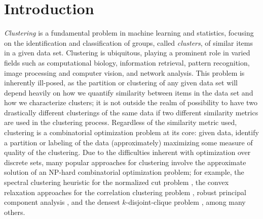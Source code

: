 \documentclass[twoside,11pt]{article}
\newcommand{\0}{\bs{0}}
\begin{document}
\allowdisplaybreaks

\section{Introduction} \label{intro}
\emph{Clustering} is a fundamental problem in machine learning and statistics, focusing on the identification and classification
of groups, called \emph{clusters}, of similar items in a given data set. Clustering is ubiquitous, playing a prominent role
in varied fields such as computational biology, information retrieval, pattern recognition, image processing and computer vision,
and network analysis.
This problem is inherently ill-posed, as the partition or clustering of any given data set will depend heavily on how we
quantify similarity between items in the data set and how we characterize clusters; it is not outside the realm of possibility to
have two drastically different clusterings of the same data if two different similarity metrics are used in the clustering process.
Regardless of the similarity metric used, clustering is a combinatorial optimization
problem at its core: given data, identify a partition or labeling of the data (approximately) maximizing some
measure of quality of the clustering.
%
Due to the difficulties inherent with optimization over discrete sets, many popular approaches for clustering involve
the approximate solution of an NP-hard combinatorial optimization problem; for example, the spectral clustering heuristic
for the normalized cut problem \citep{dhillon2004kernel, ng2002spectral}, the convex relaxation
approaches for the correlation clustering problem \citep{mathieu2010correlation},
robust principal component analysis \citep{chen2014clustering, oymak2011finding},
and the densest $k$-disjoint-clique problem \citep{ames2014convex, ames2014guaranteed}, among many others.
\end{document}

